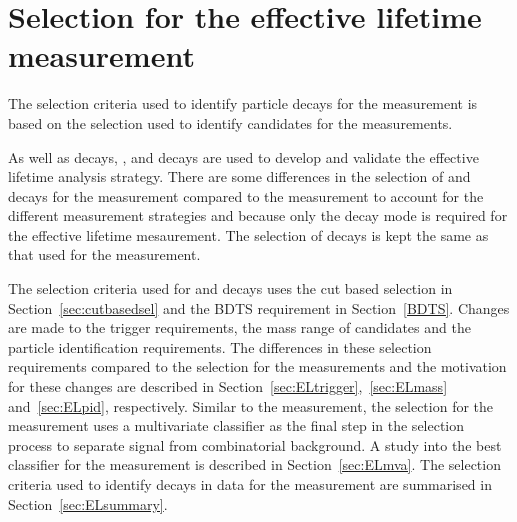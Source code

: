 \clearpage
\section[Selection for the \bsmumu effective lifetime measurement]{Selection for the \boldmath{\bsmumu} effective lifetime measurement}
\label{sec:ELsel}



The selection criteria used to identify particle decays for the \bsmumu \el measurement is based on the selection used to identify candidates for the \BF measurements. 

As well as \bsmumu decays, \bdkpi, \bskk and \bsjpsiphi decays are used to develop and validate the effective lifetime analysis strategy. There are some differences in the selection of \bsmumu and \bhh decays for the \el measurement compared to the \BF measurement to account for the different measurement strategies and because only the \bs decay mode is required for the effective lifetime mesaurement. The selection of \bsjpsiphi decays is kept the same as that used for the \BF measurement.


The selection criteria used for \bsmumu and \bhh decays uses the cut based selection in Section~\ref{sec:cutbasedsel} and the BDTS requirement in Section~\ref{BDTS}. Changes are made to the trigger requirements, the mass range of candidates and the particle identification requirements. The differences in these selection requirements compared to the selection for the \BF measurements and the motivation for these changes are described in Section~\ref{sec:ELtrigger},~\ref{sec:ELmass} and~\ref{sec:ELpid}, respectively. 
Similar to the \BF measurement, the selection for the \el measurement uses a multivariate classifier as the final step in the selection process to separate signal from combinatorial background. A study into the best classifier for the \el measurement is described in Section~\ref{sec:ELmva}.
The selection criteria used to identify decays in data for the \bsmumu \el measurement are summarised in Section~\ref{sec:ELsummary}. 

